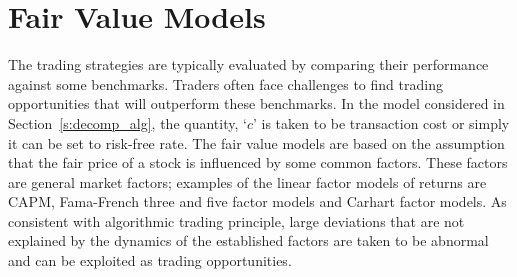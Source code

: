 


\section{Fair Value Models}


The trading strategies are typically evaluated by comparing their performance against some benchmarks. Traders often face challenges to find trading opportunities that will outperform these benchmarks. In the model considered in Section~\ref{s:decomp_alg}, the quantity, `$c$' is taken to be transaction cost or simply it can be set to risk-free rate. The fair value models are based on the assumption that the fair price of a stock is influenced by some common factors. These factors are general market factors; examples of the linear factor models of returns are CAPM, Fama-French three and five factor models and Carhart factor models. As consistent with algorithmic trading principle, large deviations that are not explained by the dynamics of the established factors are taken to be abnormal and can be exploited as trading opportunities.


